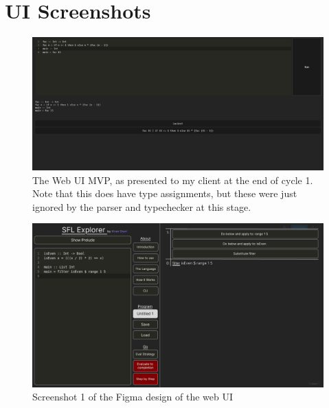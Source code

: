 \chapter{UI Screenshots}
\begin{figure}[h]
    \centering
    \includegraphics[width=1\linewidth]{images/cycle-1-end.png} 
    \captionsetup{justification=centering}
    \caption{The Web UI \ac{MVP}, as presented to my client at the end of cycle 1. Note that this does have type assignments, but these were just ignored by the parser and typechecker at this stage. }
    \label{fig:screenshot_cycle_1_end}
\end{figure}

\begin{figure}[h]
    \centering
    \includegraphics[width=1\linewidth]{images/figma_1.png} 
    \captionsetup{justification=centering}
    \caption{Screenshot 1 of the Figma design of the web UI}
    \label{fig:screenshot_figma1}
\end{figure}

